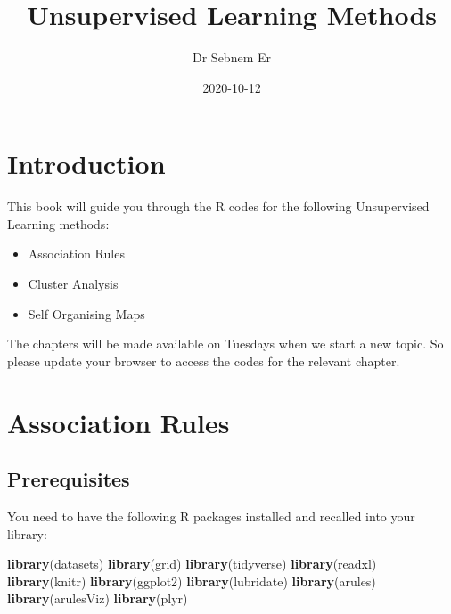 \documentclass[
]{book}
\title{Unsupervised Learning Methods}
\author{Dr Sebnem Er}
\date{2020-10-12}
\newenvironment{Shaded}{\begin{snugshade}}{\end{snugshade}}
\newcommand{\KeywordTok}[1]{\textcolor[rgb]{0.13,0.29,0.53}{\textbf{#1}}}
\newcommand{\NormalTok}[1]{#1}
\providecommand{\tightlist}{%
  \setlength{\itemsep}{0pt}\setlength{\parskip}{0pt}}
\begin{document}
\maketitle

{
\setcounter{tocdepth}{1}
\tableofcontents
}
\hypertarget{introduction}{%
\chapter{Introduction}\label{introduction}}

This book will guide you through the R codes for the following Unsupervised Learning methods:

\begin{itemize}
\tightlist
\item
  Association Rules
\item
  Cluster Analysis
\item
  Self Organising Maps
\end{itemize}

The chapters will be made available on Tuesdays when we start a new topic. So please update your browser to access the codes for the relevant chapter.

\hypertarget{association-rules}{%
\chapter{Association Rules}\label{association-rules}}

\hypertarget{prerequisites}{%
\section{Prerequisites}\label{prerequisites}}

You need to have the following R packages installed and recalled into your library:

\begin{Shaded}
\begin{Highlighting}[]
\KeywordTok{library}\NormalTok{(datasets)}
\KeywordTok{library}\NormalTok{(grid)}
\KeywordTok{library}\NormalTok{(tidyverse)}
\KeywordTok{library}\NormalTok{(readxl)}
\KeywordTok{library}\NormalTok{(knitr)}
\KeywordTok{library}\NormalTok{(ggplot2)}
\KeywordTok{library}\NormalTok{(lubridate)}
\KeywordTok{library}\NormalTok{(arules)}
\KeywordTok{library}\NormalTok{(arulesViz)}
\KeywordTok{library}\NormalTok{(plyr)}
\end{Highlighting}
\end{Shaded}
\end{document}
